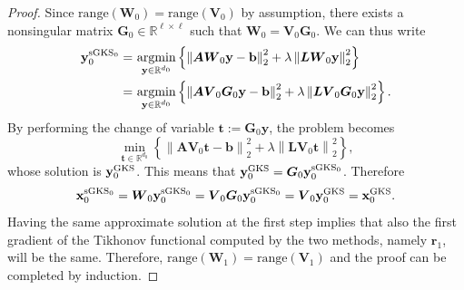 \documentclass[%
  a4paper,
  onecolumn,
  colorlinks,
]{preprint}
\theoremstyle{plain}
\theoremstyle{definition}
\newcommand{\R}{\ensuremath{\mathbb{R}}}
\newcommand{\norm}[1]{\left\|#1\right\|}
\newcommand{\bA}{\ensuremath{\boldsymbol{A}}}
\newcommand{\bG}{\ensuremath{\boldsymbol{G}}}
\newcommand{\bL}{\ensuremath{\boldsymbol{L}}}
\newcommand{\bV}{\ensuremath{\boldsymbol{V}}}
\newcommand{\bW}{\ensuremath{\boldsymbol{W}}}
\newcommand{\bb}{\mathbf{b}}
\newcommand{\br}{\mathbf{r}}
\newcommand{\by}{\mathbf{y}}
\newcommand{\bx}{\mathbf{x}}
\newcommand{\bt}{\mathbf{t}}
\DeclareMathOperator*{\argmin}{argmin}
\begin{document}
\begin{proof}
Since $\text{range}({\bW}_0)=\text{range}(\bV_0)$ by assumption, there exists a nonsingular matrix $\bG_0\in\mathbb{R}^{\ell \times\ell}$ such that $\bW_0=\bV_0\bG_0$. We can thus write 
\begin{align*}
\by_0^{\rm sGKS_0}=&\,\argmin_{\by \in \R^{d_0}} \left\{ \norm{\bA\bW_0\by - \bb}_2^2 + \lambda\norm{\bL\bW_0\by}_2^2 \right\}\\
=&\,\argmin_{\by \in \R^{d_0}} \left\{ \norm{\bA\bV_0\bG_0\by - \bb}_2^2 + \lambda\norm{\bL\bV_0\bG_0\by}_2^2 \right\}.
\end{align*}
By performing the change of variable $\bt:=\bG_0\by$, the problem becomes
$$\min_{\bt \in \R^{d_0}} \left\{ \norm{\bA\bV_0\bt - \bb}_2^2 + \lambda\norm{\bL\bV_0\bt}_2^2 \right\},$$
whose solution is $\by_0^{\rm GKS}$. This means that $\by_0^{\rm GKS}=\bG_0\by_0^{\rm sGKS_0}$. Therefore
$$\bx_0^{\rm sGKS_0}=\bW_0\by_0^{\rm sGKS_0}=\bV_0\bG_0\by_0^{\rm sGKS_0}=\bV_0\by_0^{\rm GKS}=\bx_0^{\rm GKS}.$$
Having the same approximate solution at the first step implies that also the first gradient of the Tikhonov functional computed by the two methods, namely $\br_1$, will be the same. Therefore, $\text{range}(\bW_1)=\text{range}(\bV_1)$ and the proof can be completed by induction.
\end{proof}
\end{document}
